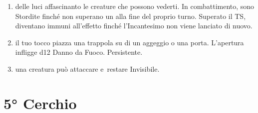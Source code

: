 \documentclass[itdr]{subfiles}
\begin{document}
\begin{enumerate}
	\item {} delle luci affascinanto le creature che possono vederti. In combattimento, sono Stordite finché non superano un  alla fine del proprio turno. Superato il TS, diventano immuni all'effetto finché l'Incantesimo non viene lanciato di nuovo.
	\item {} il tuo tocco piazza una trappola su di un aggeggio o una porta. L'apertura infligge d12 Danno da Fuoco. Persistente.
	\item {} una creatura può attaccare e~restare Invisibile.
\end{enumerate}

\vfill
\break

\section{5° Cerchio}
\def \spellcircle {5}
\end{document}
